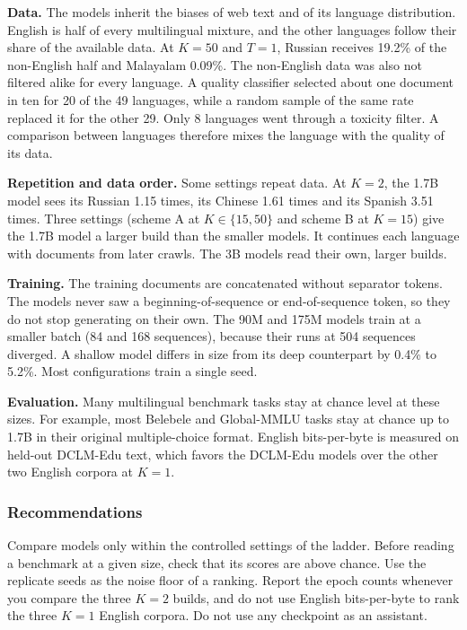 \textbf{Data.} The models inherit the biases of web text and of its language distribution. English is half of every multilingual mixture, and the other languages follow their share of the available data. At $K=50$ and $T=1$, Russian receives 19.2\% of the non-English half and Malayalam 0.09\%. The non-English data was also not filtered alike for every language. A quality classifier selected about one document in ten for 20 of the 49 languages, while a random sample of the same rate replaced it for the other 29. Only 8 languages went through a toxicity filter. A comparison between languages therefore mixes the language with the quality of its data.

\textbf{Repetition and data order.} Some settings repeat data. At $K=2$, the 1.7B model sees its Russian 1.15 times, its Chinese 1.61 times and its Spanish 3.51 times. Three settings (scheme A at $K \in \{15, 50\}$ and scheme B at $K=15$) give the 1.7B model a larger build than the smaller models. It continues each language with documents from later crawls. The 3B models read their own, larger builds.

\textbf{Training.} The training documents are concatenated without separator tokens. The models never saw a beginning-of-sequence or end-of-sequence token, so they do not stop generating on their own. The 90M and 175M models train at a smaller batch (84 and 168 sequences), because their runs at 504 sequences diverged. A shallow model differs in size from its deep counterpart by 0.4\% to 5.2\%. Most configurations train a single seed.

\textbf{Evaluation.} Many multilingual benchmark tasks stay at chance level at these sizes. For example, most Belebele and Global-MMLU tasks stay at chance up to 1.7B in their original multiple-choice format. English bits-per-byte is measured on held-out DCLM-Edu text, which favors the DCLM-Edu models over the other two English corpora at $K=1$.

\subsubsection*{Recommendations}

Compare models only within the controlled settings of the ladder. Before reading a benchmark at a given size, check that its scores are above chance. Use the replicate seeds as the noise floor of a ranking. Report the epoch counts whenever you compare the three $K=2$ builds, and do not use English bits-per-byte to rank the three $K=1$ English corpora. Do not use any checkpoint as an assistant.

